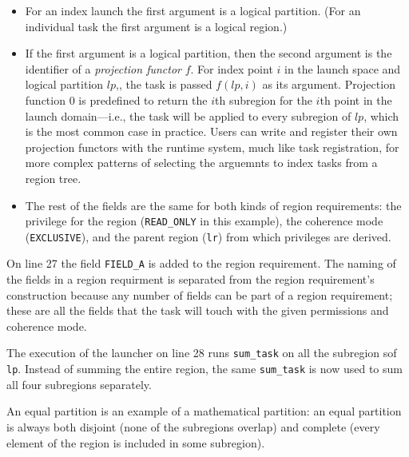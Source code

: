 \begin{itemize}
\item For an index launch the first argument is a logical partition. (For an individual task the first argument is a logical region.)

\item If the first argument is a logical partition, then the second argument is the identifier of a {\em projection functor} $f$. For index point $i$ in the launch space
  and logical partition $lp$,,
  the task is passed $f(lp,i)$ as its argument.   Projection function 0 is predefined to return the $i$th subregion for the $i$th point in the launch domain---i.e., the task will be applied to every subregion of $lp$, which is the most common case in practice. Users can write and register their own projection functors with the runtime
  system, much like task registration, for more complex patterns of selecting
  the arguemnts to index tasks from a region tree.

\item The rest of the fields are the same for both kinds of region requirements: the privilege for the region ({\tt READ\_ONLY} in this example), the coherence mode ({\tt EXCLUSIVE}), and the parent region ({\tt lr}) from which privileges are derived.
\end{itemize}
On line 27 the field {\tt FIELD\_A} is added to the region requirement.  The naming of the fields in a region requirment is separated from the region requirement's construction because any number of fields can be part of a region requirement; these are all the fields that the task will touch with the given permissions and coherence mode.

The execution of the launcher on line 28 runs {\tt sum\_task} on all the subregion sof {\tt lp}.  Instead of summing the entire region, the same {\tt sum\_task} is now used to sum all four subregions separately.


An equal partition is an example of a mathematical partition: an equal partition is always both disjoint (none of the subregions overlap) and complete (every element of the region is included in some subregion).




\begin{figure}
  {\small
   
  }
  \caption{}
  \label{fig:equalpart}
\end{figure}


